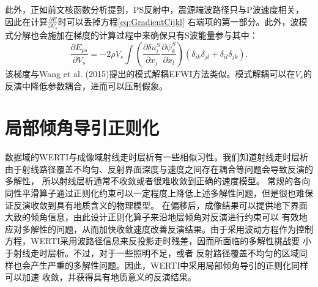 此外，正如前文核函数分析提到，PS反射中，震源端波路径只与P波速度相关，
因此在计算$\frac{\partial E}{\partial V_s}$时可以丢掉方程\eqref{eq:GradientCijkl} 
右端项的第一部分。此外，波模式分解也会施加在梯度的计算过程中来确保只有S波能量参与其中：
\begin{equation}
    \frac{\partial E_{ps}}{\partial V_s}=-2\rho V_s
    \int (\frac{\partial \delta u^S_{i}}{\partial
    x_j}\frac{\partial \psi^S_{k}}{\partial x_l})
    (\delta_{ik}\delta_{jl}+
    \delta_{il}\delta_{jk}).
    \label{eq:GradientVel_S}
\end{equation}
该梯度与Wang et al. (2015)\cite{wang:2015}提出的模式解耦EFWI方法类似。模式解耦可以在$V_s$的反演中降低参数耦合，进而可以压制假象。

\section{局部倾角导引正则化}
数据域的WERTI与成像域射线走时层析有一些相似习性。我们知道射线走时层析由于射线路径覆盖不均匀、反射界面深度与速度之间存在耦合等问题会导致反演的多解性，
所以射线层析通常不收敛或者很难收敛到正确的速度模型。
常规的各向同性平滑算子通过正则化约束可以一定程度上降低上述多解性问题，但是很也难保证反演收敛到具有地质含义的物理模型。
在偏移后，成像结果可以提供地下界面大致的倾角信息，由此设计正则化算子来沿地层倾角对反演进行约束可以
有效地应对多解性的问题，从而加快收敛速度改善反演结果。由于采用波动方程作为控制方程，WERTI采用波路径信息来反投影走时残差，因而所面临的多解性挑战要
小于射线走时层析。不过，对于一些照明不足，或者
反射路径覆盖不均匀的区域同样也会产生严重的多解性问题。因此，WERTI中采用局部倾角导引的正则化同样可以加速
收敛，并获得具有地质意义的反演结果。

